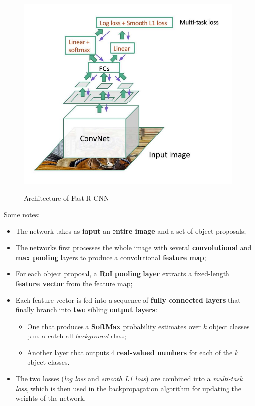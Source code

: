 \begin{figure}[h!]
		\centering
        \includegraphics[scale = 0.70]{img/fast r-cnn.jpg}
		\label{fast r-cnn}
        \caption{Architecture of Fast R-CNN}
\end{figure}

Some notes:

\begin{itemize}
    \item The network takes as \textbf{input} an \textbf{entire image} and a set of object proposals;
    \item The networks first processes the whole image with several \textbf{convolutional} and \textbf{max pooling} layers to produce a convolutional \textbf{feature map};
    \item For each object proposal, a \textbf{RoI pooling layer} extracts a fixed-length \textbf{feature vector} from the feature map;
    \item Each feature vector is fed into a sequence of \textbf{fully connected layers} that finally branch into \textbf{two} sibling \textbf{output layers}:

    \begin{itemize}
        \item One that produces a \textbf{SoftMax} probability estimates over $k$ object classes plus a catch-all \textit{background} class;
        \item Another layer that outputs 4 \textbf{real-valued numbers} for each of the $k$ object classes.
    \end{itemize}
    \item The two losses (\textit{log loss} and \textit{smooth L1 loss}) are combined into a \textit{multi-task loss}, which is then used in the backpropagation algorithm for updating the weights of the network.
\end{itemize}

